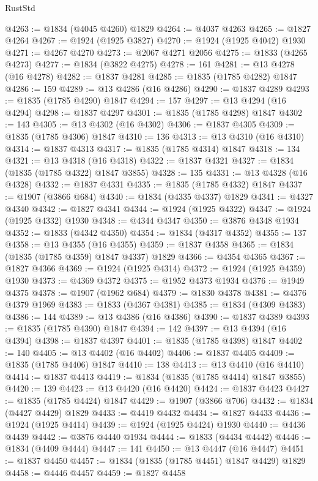\begin{lexlean}{RustStd}
\begin{coremodule}
@4263 := @1834 (@4045 @4260) @1829
@4264 := @4037 @4263
@4265 := @1827 @4264
@4267 := @1924 (@1925 @3827)
@4270 := @1924 (@1925 @4042) @1930
@4271 := @4267 @4270
@4273 := @2067 @4271 @2056
@4275 := @1833 (@4265 @4273)
@4277 := @1834 (@3822 @4275)
@4278 := 161
@4281 := @13 @4278 (@16 @4278)
@4282 := @1837 @4281
@4285 := @1835 (@1785 @4282) @1847
@4286 := 159
@4289 := @13 @4286 (@16 @4286)
@4290 := @1837 @4289
@4293 := @1835 (@1785 @4290) @1847
@4294 := 157
@4297 := @13 @4294 (@16 @4294)
@4298 := @1837 @4297
@4301 := @1835 (@1785 @4298) @1847
@4302 := 143
@4305 := @13 @4302 (@16 @4302)
@4306 := @1837 @4305
@4309 := @1835 (@1785 @4306) @1847
@4310 := 136
@4313 := @13 @4310 (@16 @4310)
@4314 := @1837 @4313
@4317 := @1835 (@1785 @4314) @1847
@4318 := 134
@4321 := @13 @4318 (@16 @4318)
@4322 := @1837 @4321
@4327 := @1834 (@1835 (@1785 @4322) @1847 @3855)
@4328 := 135
@4331 := @13 @4328 (@16 @4328)
@4332 := @1837 @4331
@4335 := @1835 (@1785 @4332) @1847
@4337 := @1907 (@3866 @684)
@4340 := @1834 (@4335 @4337) @1829
@4341 := @4327 @4340
@4342 := @1827 @4341
@4344 := @1924 (@1925 @4322)
@4347 := @1924 (@1925 @4332) @1930
@4348 := @4344 @4347
@4350 := @3876 @4348 @1934
@4352 := @1833 (@4342 @4350)
@4354 := @1834 (@4317 @4352)
@4355 := 137
@4358 := @13 @4355 (@16 @4355)
@4359 := @1837 @4358
@4365 := @1834 (@1835 (@1785 @4359) @1847 @4337) @1829
@4366 := @4354 @4365
@4367 := @1827 @4366
@4369 := @1924 (@1925 @4314)
@4372 := @1924 (@1925 @4359) @1930
@4373 := @4369 @4372
@4375 := @1952 @4373 @1934
@4376 := @1949 @4375
@4378 := @1907 (@1962 @684)
@4379 := @1830 @4378
@4381 := @4376 @4379 @1969
@4383 := @1833 (@4367 @4381)
@4385 := @1834 (@4309 @4383)
@4386 := 144
@4389 := @13 @4386 (@16 @4386)
@4390 := @1837 @4389
@4393 := @1835 (@1785 @4390) @1847
@4394 := 142
@4397 := @13 @4394 (@16 @4394)
@4398 := @1837 @4397
@4401 := @1835 (@1785 @4398) @1847
@4402 := 140
@4405 := @13 @4402 (@16 @4402)
@4406 := @1837 @4405
@4409 := @1835 (@1785 @4406) @1847
@4410 := 138
@4413 := @13 @4410 (@16 @4410)
@4414 := @1837 @4413
@4419 := @1834 (@1835 (@1785 @4414) @1847 @3855)
@4420 := 139
@4423 := @13 @4420 (@16 @4420)
@4424 := @1837 @4423
@4427 := @1835 (@1785 @4424) @1847
@4429 := @1907 (@3866 @706)
@4432 := @1834 (@4427 @4429) @1829
@4433 := @4419 @4432
@4434 := @1827 @4433
@4436 := @1924 (@1925 @4414)
@4439 := @1924 (@1925 @4424) @1930
@4440 := @4436 @4439
@4442 := @3876 @4440 @1934
@4444 := @1833 (@4434 @4442)
@4446 := @1834 (@4409 @4444)
@4447 := 141
@4450 := @13 @4447 (@16 @4447)
@4451 := @1837 @4450
@4457 := @1834 (@1835 (@1785 @4451) @1847 @4429) @1829
@4458 := @4446 @4457
@4459 := @1827 @4458

\end{coremodule}
\end{lexlean}
